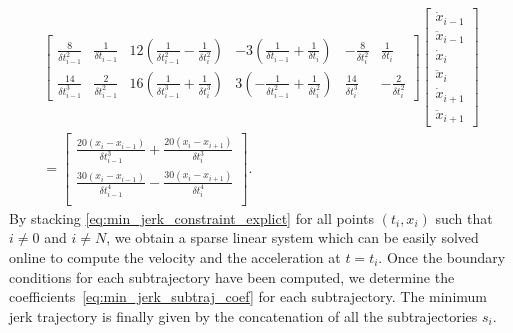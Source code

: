 \begin{equation}
\label{eq:min_jerk_constraint_explict}
\begin{split}
\left[ 
\begin{array}{cc|cc|cc} 
\frac{8}{\delta t _ {i-1} ^2} & \frac{1}{\delta t _ {i-1}} & 12 \left( \frac{1}{\delta t _ {i-1} ^2} - \frac{1}{\delta t _ {i} ^2} \right) & -3 \left( \frac{1}{\delta t _ {i-1}} + \frac{1}{\delta t _ {i}} \right) &  -\frac{8}{\delta t _ {i} ^2} & \frac{1}{\delta t _ {i}} \\ 
\frac{14}{\delta t _ {i-1} ^3} & \frac{2}{\delta t _ {i-1} ^ 2} & 16 \left( \frac{1}{\delta t _ {i-1} ^3} + \frac{1}{\delta t _ {i} ^3} \right) & 3 \left( - \frac{1}{\delta t _ {i-1} ^ 2} + \frac{1}{\delta t _ {i} ^ 2} \right) &  \frac{14}{\delta t _ {i} ^3} & - \frac{2}{\delta t _ {i} ^ 2} 
\end{array} 
\right] 
\begin{bmatrix} 
\dot{x} _ {i-1} \\ 
\ddot{x} _ {i-1} \\ 
\hline 
\dot{x} _ {i} \\ 
\ddot{x} _ {i} \\ 
\hline 
\dot{x} _ {i +1} \\ 
\ddot{x} _ {i + 1} 
\end{bmatrix} \\
= 
\begin{bmatrix} 
\frac{20 (x _ i - x _ {i - 1})}{\delta t _ {i - 1} ^ 3} + \frac{20 (x _ i - x _ {i + 1})}{\delta t _ {i} ^ 3} \\ 
\frac{30 (x _ i - x _ {i - 1})}{\delta t _ {i - 1} ^ 4} - \frac{30 (x _ i - x _ {i + 1})}{\delta t _ {i} ^ 4}  \\ 
\end{bmatrix}.
\end{split}
\end{equation}
By stacking \eqref{eq:min_jerk_constraint_explict} for all points $(t_i, x_i)$ such that $i \ne 0$ and $i \ne N$, we obtain a sparse linear system which can be easily solved online to compute the velocity and the acceleration at $t=t_i$. Once the boundary conditions for each subtrajectory have been computed, we determine the coefficients~\eqref{eq:min_jerk_subtraj_coef} for each subtrajectory. The minimum jerk trajectory is finally given by the concatenation of all the subtrajectories $s_i$. 